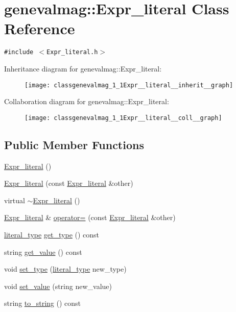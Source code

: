\hypertarget{classgenevalmag_1_1Expr__literal}{
\section{genevalmag::Expr\_\-literal Class Reference}
\label{classgenevalmag_1_1Expr__literal}
}
{\tt \#include $<$Expr\_\-literal.h$>$}

Inheritance diagram for genevalmag::Expr\_\-literal:\nopagebreak
\begin{figure}[H]
\begin{center}
\leavevmode
\texttt{[image: classgenevalmag\_1\_1Expr\_\_literal\_\_inherit\_\_graph]}
\end{center}
\end{figure}
Collaboration diagram for genevalmag::Expr\_\-literal:\nopagebreak
\begin{figure}[H]
\begin{center}
\leavevmode
\texttt{[image: classgenevalmag\_1\_1Expr\_\_literal\_\_coll\_\_graph]}
\end{center}
\end{figure}
\subsection*{Public Member Functions}
\begin{CompactItemize}
\item 
\hyperlink{classgenevalmag_1_1Expr__literal_ad56a6d5a1929c03b3c19ac10f06bf73}{Expr\_\-literal} ()
\item 
\hyperlink{classgenevalmag_1_1Expr__literal_d8dff199ac5faaa7808b24bc6e99aa84}{Expr\_\-literal} (const \hyperlink{classgenevalmag_1_1Expr__literal}{Expr\_\-literal} \&other)
\item 
virtual \hyperlink{classgenevalmag_1_1Expr__literal_faa929f1cd65a7486a29e4d110c73f89}{$\sim$Expr\_\-literal} ()
\item 
\hyperlink{classgenevalmag_1_1Expr__literal}{Expr\_\-literal} \& \hyperlink{classgenevalmag_1_1Expr__literal_76f4c6a1fd0fe094b929d6e01868e0ed}{operator=} (const \hyperlink{classgenevalmag_1_1Expr__literal}{Expr\_\-literal} \&other)
\item 
\hyperlink{namespacegenevalmag_054e5e9167597919bb2fe12ba999fb31}{literal\_\-type} \hyperlink{classgenevalmag_1_1Expr__literal_e821eeb6e591dfe1d8ee62a38367618e}{get\_\-type} () const 
\item 
string \hyperlink{classgenevalmag_1_1Expr__literal_80638840b211284c6d4b4babbe08ce21}{get\_\-value} () const 
\item 
void \hyperlink{classgenevalmag_1_1Expr__literal_6a09dcb9f4c693c55b30ead8b70477fe}{set\_\-type} (\hyperlink{namespacegenevalmag_054e5e9167597919bb2fe12ba999fb31}{literal\_\-type} new\_\-type)
\item 
void \hyperlink{classgenevalmag_1_1Expr__literal_f5e0c53c8df7f902540387c4ff6912e7}{set\_\-value} (string new\_\-value)
\item 
string \hyperlink{classgenevalmag_1_1Expr__literal_2e023f432f0a46b75f65cb0e36ac6583}{to\_\-string} () const 
\end{CompactItemize}
